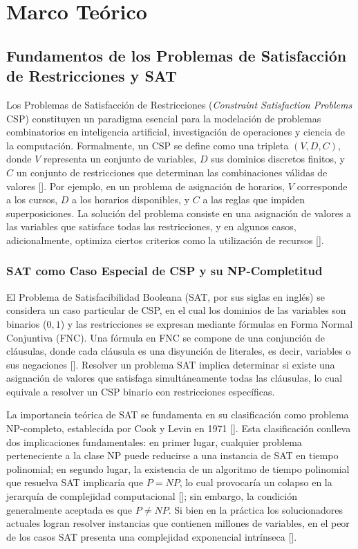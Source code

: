\chapter{Marco Te\'orico}\label{chapter:state-of-the-art}

\section{Fundamentos de los Problemas de Satisfacci\'on de Restricciones y SAT}
\label{sec:fundamentos-sat-csp}

Los Problemas de Satisfacci\'on de Restricciones (\textit{Constraint Satisfaction Problems} CSP) constituyen un paradigma esencial para la modelaci\'on de problemas combinatorios en inteligencia artificial, investigaci\'on de operaciones y ciencia de la computaci\'on. Formalmente, un CSP se define como una tripleta $(V,D,C)$, donde $V$ representa un conjunto de variables, $D$ sus dominios discretos finitos, y $C$ un conjunto de restricciones que determinan las combinaciones v\'alidas de valores [\cite{garcia_conferencia1}]. Por ejemplo, en un problema de asignaci\'on de horarios, $V$ corresponde a los cursos, $D$ a los horarios disponibles, y $C$ a las reglas que impiden superposiciones. La soluci\'on del problema consiste en una asignaci\'on de valores a las variables que satisface todas las restricciones, y en algunos casos, adicionalmente, optimiza ciertos criterios como la utilizaci\'on de recursos [\cite{almabetterCSP}].

\subsection{SAT como Caso Especial de CSP y su NP-Completitud}
El Problema de Satisfacibilidad Booleana (SAT, por sus siglas en ingl\'es) se considera un caso particular de CSP, en el cual los dominios de las variables son binarios (${0,1}$) y las restricciones se expresan mediante f\'ormulas en Forma Normal Conjuntiva (FNC). Una f\'ormula en FNC se compone de una conjunci\'on de cl\'ausulas, donde cada cl\'ausula es una disyunci\'on de literales, es decir, variables o sus negaciones [\cite{zulkoski2018understanding}]. Resolver un problema SAT implica determinar si existe una asignaci\'on de valores que satisfaga simult\'aneamente todas las cl\'ausulas, lo cual equivale a resolver un CSP binario con restricciones espec\'ificas.

La importancia te\'orica de SAT se fundamenta en su clasificaci\'on como problema NP-completo, establecida por Cook y Levin en 1971 [\cite{marques-silva2024cdcl}]. Esta clasificaci\'on conlleva dos implicaciones fundamentales: en primer lugar, cualquier problema perteneciente a la clase NP puede reducirse a una instancia de SAT en tiempo polinomial; en segundo lugar, la existencia de un algoritmo de tiempo polinomial que resuelva SAT implicar\'ia que $P=NP$, lo cual provocar\'ia un colapso en la jerarqu\'ia de complejidad computacional [\cite{guo2024progress}]; sin embargo, la condici\'on generalmente aceptada es que $P \neq NP$. Si bien en la pr\'actica los solucionadores actuales logran resolver instancias que contienen millones de variables, en el peor de los casos SAT presenta una complejidad exponencial intr\'inseca [\cite{marques-silva2024cdcl}].

